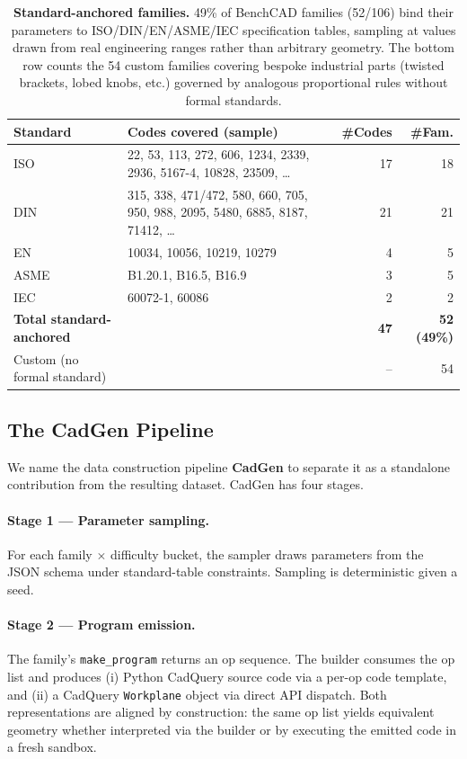 \documentclass{article}
\begin{document}
\begin{table}[t]
\centering
\small
\caption{\textbf{Standard-anchored families.} 49\% of BenchCAD families (52/106) bind their parameters to ISO/DIN/EN/ASME/IEC specification tables, sampling at values drawn from real engineering ranges rather than arbitrary geometry. The bottom row counts the 54 custom families covering bespoke industrial parts (twisted brackets, lobed knobs, etc.) governed by analogous proportional rules without formal standards.}
\label{tab:standards}
\begin{tabular}{llrr}
\toprule
Standard & Codes covered (sample) & \#Codes & \#Fam. \\
\midrule
ISO   & 22, 53, 113, 272, 606, 1234, 2339, 2936, 5167-4, 10828, 23509, \ldots & 17 & 18 \\
DIN   & 315, 338, 471/472, 580, 660, 705, 950, 988, 2095, 5480, 6885, 8187, 71412, \ldots & 21 & 21 \\
EN    & 10034, 10056, 10219, 10279                       & 4 & 5 \\
ASME  & B1.20.1, B16.5, B16.9                            & 3 & 5 \\
IEC   & 60072-1, 60086                                   & 2 & 2 \\
\midrule
\textbf{Total standard-anchored}   & & \textbf{47} & \textbf{52 (49\%)} \\
Custom (no formal standard)        & & --          & 54 \\
\bottomrule
\end{tabular}
\end{table}


\subsection{The CadGen Pipeline}
We name the data construction pipeline \textbf{CadGen} to separate it as a standalone contribution from the resulting dataset. CadGen has four stages.

\paragraph{Stage 1 --- Parameter sampling.} For each family $\times$ difficulty bucket, the sampler draws parameters from the JSON schema under standard-table constraints. Sampling is deterministic given a seed.

\paragraph{Stage 2 --- Program emission.} The family's \texttt{make\_program} returns an op sequence. The builder consumes the op list and produces (i) Python CadQuery source code via a per-op code template, and (ii) a CadQuery \texttt{Workplane} object via direct API dispatch. Both representations are aligned by construction: the same op list yields equivalent geometry whether interpreted via the builder or by executing the emitted code in a fresh sandbox.
\end{document}
